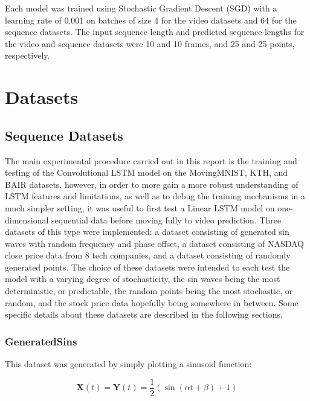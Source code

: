 \documentclass{scrartcl}
\begin{document}
Each model was trained using Stochastic Gradient Descent (SGD) with a learning
rate of 0.001 on batches of size 4 for the video datasets and 64 for the
sequence datasets. The input sequence length and predicted sequence lengths for
the video and sequence datasets were 10 and 10 frames, and 25 and 25 points,
respectively.

\section{Datasets}
\label{sec:datasets}

\subsection{Sequence Datasets}
\label{subsec:sequence_datasets}

The main experimental procedure carried out in this report is the training and
testing of the Convolutional LSTM model on the MovingMNIST, KTH, and BAIR
datasets, however, in order to more gain a more robust understanding of LSTM
features and limitations, as well as to debug the training mechanisms in a much
simpler setting, it was useful to first test a Linear LSTM model on
one-dimensional sequential data before moving fully to video prediction. Three
datasets of this type were implemented: a dataset consisting of generated sin
waves with random frequency and phase offset, a dataset consisting of NASDAQ
close price data from 8 tech companies, and a dataset consisting of randomly
generated points. The choice of these datasets were intended to each test the
model with a varying degree of stochasticity, the sin waves being the most
deterministic, or predictable, the random points being the most stochastic, or
random, and the stock price data hopefully being somewhere in between. Some
specific details about these datasets are described in the following sections.

\subsubsection{GeneratedSins}
\label{subsubsec:generatedsins_dataset}

This dataset was generated by simply plotting a sinusoid function:

\begin{equation}
	\boldsymbol{X} (t) = \boldsymbol{Y} (t) = \frac{1}{2} ( \sin (\alpha t + \beta) + 1)
	\label{eq:generated_sins}
\end{equation}
\end{document}
